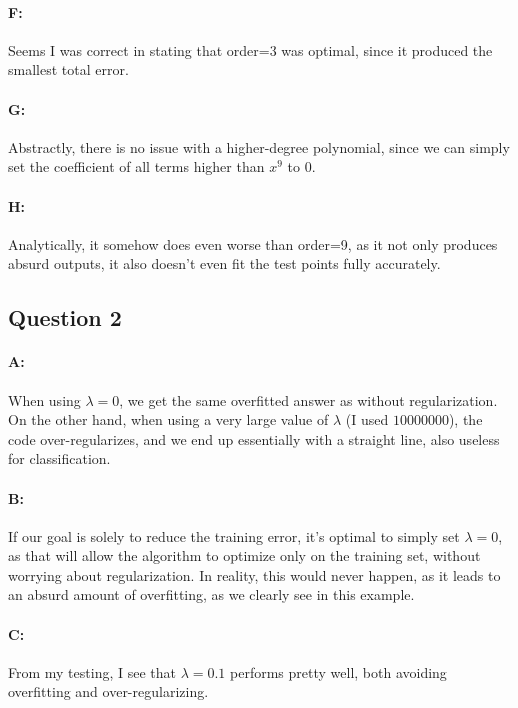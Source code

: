 \documentclass{article}
\begin{document}
\paragraph{F: } Seems I was correct in stating that order=3 was optimal, since it produced the smallest total error.

\paragraph{G: } Abstractly, there is no issue with a higher-degree polynomial, since we can simply set the coefficient of all terms higher than $x^9$ to $0$.

\paragraph{H: } Analytically, it somehow does even worse than order=9, as it not only produces absurd outputs, it also doesn't even fit the test points fully accurately.

\subsection{Question 2}

\paragraph{A: } When using $\lambda=0$, we get the same overfitted answer as without regularization. On the other hand, when using a very large value of $\lambda$ (I used $10000000$), the code over-regularizes, and we end up essentially with a straight line, also useless for classification.

\paragraph{B: } If our goal is solely to reduce the training error, it's optimal to simply set $\lambda=0$, as that will allow the algorithm to optimize only on the training set, without worrying about regularization. In reality, this would never happen, as it leads to an absurd amount of overfitting, as we clearly see in this example.

\paragraph{C: } From my testing, I see that $\lambda=0.1$ performs pretty well, both avoiding overfitting and over-regularizing.
\end{document}
